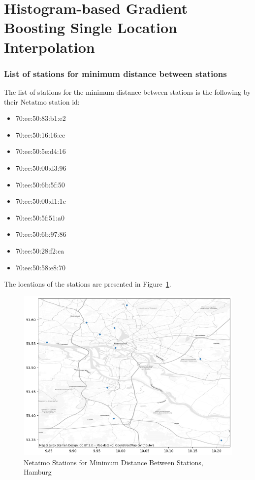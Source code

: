 \section{Histogram-based Gradient Boosting Single Location Interpolation}

\subsubsection{List of stations for minimum distance between stations}
\label{appendix stations for minimum distance between stations}

The list of stations for the minimum distance between stations is the following by their Netatmo station id:

\begin{itemize}
    \item 70:ee:50:83:b1:e2 
    \item 70:ee:50:16:16:ce
    \item 70:ee:50:5e:d4:16
    \item 70:ee:50:00:d3:96
    \item 70:ee:50:6b:5f:50
    \item 70:ee:50:00:d1:1c
    \item 70:ee:50:5f:51:a0
    \item 70:ee:50:6b:97:86
    \item 70:ee:50:28:f2:ca
    \item 70:ee:50:58:e8:70
\end{itemize}

The locations of the stations are presented in Figure~\ref{fig:eval_hamburg_locations_point_histb_10_map}.

\begin{figure}[ht]
    \centering
    \includegraphics[width=1\textwidth]{images/eval_hamburg_locations_point_histb_10_map.png}
    \caption{Netatmo Stations for Minimum Distance Between Stations, Hamburg}
    \label{fig:eval_hamburg_locations_point_histb_10_map}
\end{figure}